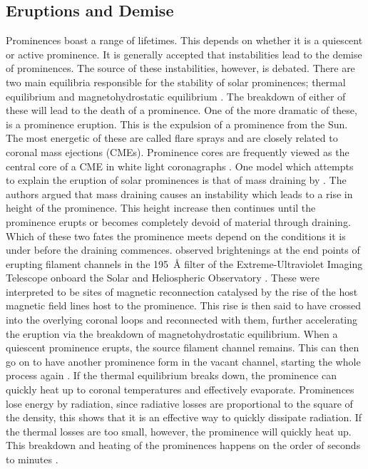 \subsection{Eruptions and Demise}

Prominences boast a range of lifetimes. This depends on whether it is a quiescent or active prominence.
It is generally accepted that instabilities lead to the demise of prominences. The source of these instabilities, however, is debated. There are two main equilibria responsible for the stability of solar prominences; thermal equilibrium and magnetohydrostatic equilibrium \citep{tandberg-hanssen_nature_1995}. The breakdown of either of these will lead to the death of a prominence. One of the more dramatic of these, is a prominence eruption. This is the expulsion of a prominence from the Sun. The most energetic of these %
are called flare sprays \citep{tandberg-hanssen_solar_1974} and are closely related to coronal mass ejections (CMEs). Prominence cores are frequently viewed as the central core of a CME in white light coronagraphs \citep{vial_solar_2015}. One model which attempts to explain the eruption of solar prominences is that of mass draining by \cite{jenkins_modeling_2019}. The authors argued that mass draining causes an instability which leads to a rise in height of the prominence. This height increase then continues until the prominence erupts or becomes completely devoid of material through draining. Which of these two fates the prominence meets depend on the conditions it is under before the draining commences. \cite{wang_transient_2013} observed brightenings at the end points of erupting filament channels in the 195~\AA{} filter of the Extreme-Ultraviolet Imaging Telescope \citep[EIT; ][]{delaboudiniere_eit_1995} onboard the Solar and Heliospheric Observatory \citep[SOHO; ][]{domingo_soho_1995}. These were interpreted to be sites of magnetic reconnection catalysed by the rise of the host magnetic field lines host to the prominence. This rise is then said to have crossed into the overlying coronal loops and reconnected with them, further accelerating the eruption via the breakdown of magnetohydrostatic equilibrium. When a quiescent prominence erupts, the source filament channel remains. This can then go on to have another prominence form in the vacant channel, starting the whole process again \citep{vial_solar_2015}. If the thermal equilibrium breaks down, the prominence can quickly heat up to coronal temperatures and effectively evaporate. Prominences lose energy by radiation, since radiative losses are proportional to the square of the density, this shows that it is an effective way to quickly dissipate radiation. If the thermal losses are too small, however, the prominence will quickly heat up. This breakdown and heating of the prominences happens on the order of seconds to minutes \citep{tandberg-hanssen_nature_1995}.

